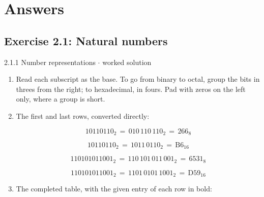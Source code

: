 \documentclass[11pt]{article}
\begin{document}
\clearpage
\section{Answers}
\begin{keepsection}\subsection{Exercise 2.1: Natural numbers}

\begin{workedbox}{2.1.1 Number representations \ensuremath{\cdot} worked solution}
\begin{enumerate}
\item Read each subscript as the base. To go from binary to octal, group the bits in threes from the right; to hexadecimal, in fours. Pad with zeros on the left only, where a group is short.
\item {}
The first and last rows, converted directly:

\begin{equation*}10110110_{2}\, =\, 010\, 110\, 110_{2}\, =\, 266_{8}\end{equation*}

\begin{equation*}10110110_{2}\, =\, 1011\, 0110_{2}\, =\, \mathrm{B}6_{16}\end{equation*}

\begin{equation*}110101011001_{2}\, =\, 110\, 101\, 011\, 001_{2}\, =\, 6531_{8}\end{equation*}

\begin{equation*}110101011001_{2}\, =\, 1101\, 0101\, 1001_{2}\, =\, \mathrm{D}59_{16}\end{equation*}
\item {}
The completed table, with the given entry of each row in bold:


\end{enumerate}
\end{workedbox}
\end{keepsection}
\end{document}
